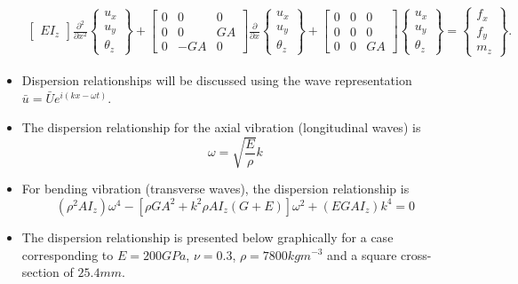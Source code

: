 \documentclass[aspectratio=169]{beamertmd}
\begin{document}
\begin{frame}[allowframebreaks]
\begin{itemize}
{\begin{align*}
\begin{bmatrix}
          EI_z \end{bmatrix} \frac{\partial^2}{\partial
                                                           x^2} \begin{Bmatrix}
                                                           u_x\\u_y\\\theta_z \end{Bmatrix}
        + \begin{bmatrix} 0 & 0 & 0\\ 0 & 0 & GA \\ 0 & -GA &
          0 \end{bmatrix} \frac{\partial}{\partial x}\begin{Bmatrix}
          u_x\\u_y\\\theta_z \end{Bmatrix} + \begin{bmatrix} 0 & 0 & 0
          \\ 0 & 0 & 0 \\ 0 & 0 & GA \end{bmatrix} \begin{Bmatrix}
          u_x\\ u_y\\\theta_z \end{Bmatrix} = \begin{Bmatrix} f_x\\
          f_y\\ m_z\end{Bmatrix}. 
      \end{align*}}
    \pagebreak
  \item Dispersion relationships will be discussed using the wave
    representation $\bar{u} = \bar{U} e^{i(k x-\omega t)}$. 
  \item The dispersion relationship for the axial vibration
    (longitudinal waves) is
    $$ \omega = \sqrt{\frac{E}{\rho}} k $$
  \item For bending vibration (transverse waves), the dispersion
    relationship is
    $$ (\rho^2AI_z)\omega^4 - \left[\rho GA^2+k^2\rho
      AI_z(G+E)\right] \omega^2 + (EGAI_z) k^4 = 0 $$
    \pagebreak
  \item The dispersion relationship is presented below graphically for
    a case corresponding to $E=200 GPa$, $\nu=0.3$, $\rho=7800 kg
    m^{-3}$ and a square cross-section of $25.4 mm$.
    \vspace{-0.5cm}
    \begin{figure}[!h]

\end{figure}
\end{itemize}
\end{frame}
\end{document}
